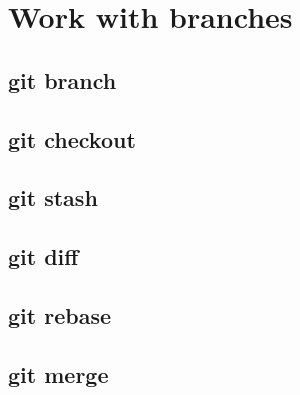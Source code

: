 \section{Work with branches}
\begin{frame}[fragile]
    \slidetitle
\end{frame}

\subsection{git branch}
\begin{frame}[fragile]
    \subslidetitle
\end{frame}

\subsection{git checkout}
\begin{frame}[fragile]
    \subslidetitle
\end{frame}

\subsection{git stash}
\begin{frame}[fragile]
    \subslidetitle
\end{frame}

\subsection{git diff}
\begin{frame}[fragile]
    \subslidetitle
\end{frame}

\subsection{git rebase}
\begin{frame}[fragile]
    \subslidetitle
\end{frame}

\subsection{git merge}
\begin{frame}[fragile]
    \subslidetitle
\end{frame}

